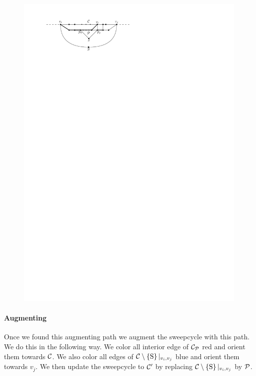     \begin{figure}[h]
      \centering
      \includegraphics[scale=1]{unifiedAlgo/img/free2chord}
      \caption{}
      \label{fig:sweep:free2chord}
    \end{figure}

    \paragraph{Augmenting}
      Once we found this augmenting path we augment the sweepcycle with this path. We do this in the following way. We color all interior edge of $\C_\P$ red and orient them towards $\C$. We also color all edges of $\cpath|_{v_i,v_j}$  blue and orient them towards $v_j$. We then update the sweepcycle to $\C'$ by replacing $\cpath|_{v_i,v_j}$ by $\P$.


